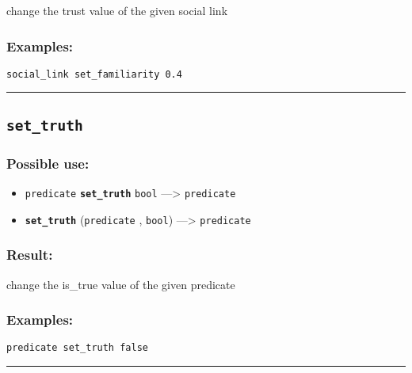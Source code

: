 \documentclass[]{book}
\providecommand{\tightlist}{%
  \setlength{\itemsep}{0pt}\setlength{\parskip}{0pt}}
\theoremstyle{definition}
\theoremstyle{definition}
\theoremstyle{definition}
\theoremstyle{remark}
\begin{document}
change the trust value of the given social link

\subsubsection{Examples:}\label{examples-324}

\begin{verbatim}
social_link set_familiarity 0.4 
\end{verbatim}

\begin{center}\rule{0.5\linewidth}{\linethickness}\end{center}

\subsection{\texorpdfstring{\texttt{set\_truth}}{set\_truth}}\label{set_truth}

\subsubsection{Possible use:}\label{possible-use-468}

\begin{itemize}
\tightlist
\item
  \texttt{predicate} \textbf{\texttt{set\_truth}} \texttt{bool}
  ---\textgreater{} \texttt{predicate}
\item
  \textbf{\texttt{set\_truth}} (\texttt{predicate} , \texttt{bool})
  ---\textgreater{} \texttt{predicate}
\end{itemize}

\subsubsection{Result:}\label{result-452}

change the is\_true value of the given predicate

\subsubsection{Examples:}\label{examples-325}

\begin{verbatim}
predicate set_truth false 
\end{verbatim}

\begin{center}\rule{0.5\linewidth}{\linethickness}\end{center}
\end{document}
